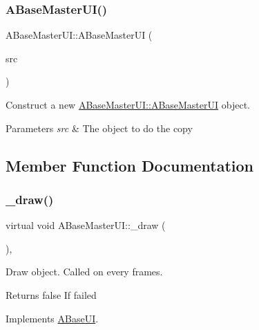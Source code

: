 \subsubsection{\texorpdfstring{A\+Base\+Master\+U\+I()}{ABaseMasterUI()}\hspace{0.1cm}{\footnotesize\ttfamily [2/2]}}
{\footnotesize\ttfamily A\+Base\+Master\+U\+I\+::\+A\+Base\+Master\+UI (\begin{DoxyParamCaption}\item[{\hyperlink{class_a_base_master_u_i}{A\+Base\+Master\+UI} const \&}]{src }\end{DoxyParamCaption})}



Construct a new \hyperlink{class_a_base_master_u_i_a311ce7af9ba882f3a274f6887c2196dc}{A\+Base\+Master\+U\+I\+::\+A\+Base\+Master\+UI} object. 


\begin{DoxyParams}{Parameters}
{\em src} & The object to do the copy \\
\hline
\end{DoxyParams}


\subsection{Member Function Documentation}
\mbox{\label{class_a_base_master_u_i_ae92346a217da747e894a8acbe39b4397}} 
\subsubsection{\texorpdfstring{\+\_\+draw()}{\_draw()}}
{\footnotesize\ttfamily virtual void A\+Base\+Master\+U\+I\+::\+\_\+draw (\begin{DoxyParamCaption}{ }\end{DoxyParamCaption})\hspace{0.3cm}{\ttfamily [protected]}, {}}



Draw object. Called on every frames. 

\begin{DoxyReturn}{Returns}
false If failed 
\end{DoxyReturn}


Implements \hyperlink{class_a_base_u_i_a3331159cbf9926557afa79e4e3eee256}{A\+Base\+UI}.



